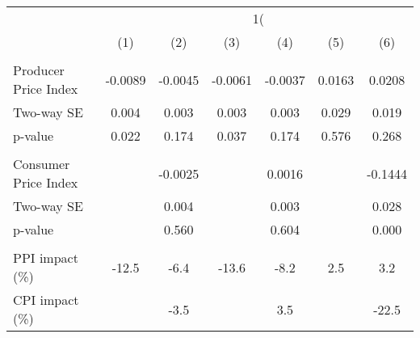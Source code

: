 {
\def\sym#1{\ifmmode^{#1}\else\(^{#1}\)\fi}
\begin{tabular}{l*{6}{c}}
\hline\hline
                    &&&\\\cmidrule(lr){2-3}\cmidrule(lr){4-5}\cmidrule(lr){6-7}
                    &         &         &         &         &         &         \\
\hline
\hline
\\ Producer Price Index&     -0.0089         &     -0.0045         &     -0.0061         &     -0.0037         &      0.0163         &      0.0208         \\
\hspace{15pt} Two-way SE&       0.004         &       0.003         &       0.003         &       0.003         &       0.029         &       0.019         \\
\hspace{25pt} p-value&       0.022         &       0.174         &       0.037         &       0.174         &       0.576         &       0.268         \\
\\ Consumer Price Index&                     &     -0.0025         &                     &      0.0016         &                     &     -0.1444         \\
\hspace{15pt} Two-way SE&                     &       0.004         &                     &       0.003         &                     &       0.028         \\
\hspace{25pt} p-value&                     &       0.560         &                     &       0.604         &                     &       0.000         \\
\hline \\ PPI impact (\%)&       -12.5         &        -6.4         &       -13.6         &        -8.2         &         2.5         &         3.2         \\
CPI impact (\%)     &                     &        -3.5         &                     &         3.5         &                     &       -22.5         \\

\end{tabular}}
